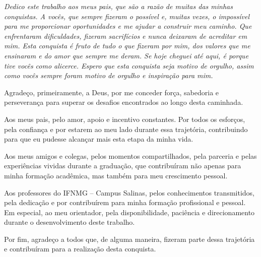 \documentclass[
	12pt,				%
	oneside,			%
	a4paper,			%
	chapter=TITLE,		%
	section=TITLE,		%
	subsection=TITLE,	%
	subsubsection=TITLE,%
	english,			%
	french,				%
	spanish,			%
	brazil,				%
	]{abntex2}
\date{\normalsize\today} %
\begin{document}
\frenchspacing          %

\pretextual

\imprimircapa                   

\imprimirfolhaderosto

\newpage

\begin{dedicatoria}
   \vspace*{\fill}
   \begin{flushright}
      \textit{Dedico este trabalho aos meus pais, que são a razão de muitas das minhas conquistas. A vocês, que sempre fizeram o possível e, muitas vezes, o impossível para me proporcionar oportunidades e me ajudar a construir meu caminho. Que enfrentaram dificuldades, fizeram sacrifícios e nunca deixaram de acreditar em mim. Esta conquista é fruto de tudo o que fizeram por mim, dos valores que me ensinaram e do amor que sempre me deram. Se hoje cheguei até aqui, é porque tive vocês como alicerce. Espero que esta conquista seja motivo de orgulho, assim como vocês sempre foram motivo de orgulho e inspiração para mim.}
   \end{flushright}
   \vspace*{\fill}
\end{dedicatoria}

\begin{agradecimentos}
Agradeço, primeiramente, a Deus, por me conceder força, sabedoria e perseverança para superar os desafios encontrados ao longo desta caminhada.

Aos meus pais, pelo amor, apoio e incentivo constantes. Por todos os esforços, pela confiança e por estarem ao meu lado durante essa trajetória, contribuindo para que eu pudesse alcançar mais esta etapa da minha vida.

Aos meus amigos e colegas, pelos momentos compartilhados, pela parceria e pelas experiências vividas durante a graduação, que contribuíram não apenas para minha formação acadêmica, mas também para meu crescimento pessoal.

Aos professores do IFNMG -- Campus Salinas, pelos conhecimentos transmitidos, pela dedicação e por contribuírem para minha formação profissional e pessoal. Em especial, ao meu orientador, pela disponibilidade, paciência e direcionamento durante o desenvolvimento deste trabalho.

Por fim, agradeço a todos que, de alguma maneira, fizeram parte dessa trajetória e contribuíram para a realização desta conquista.
\end{agradecimentos}
\end{document}
